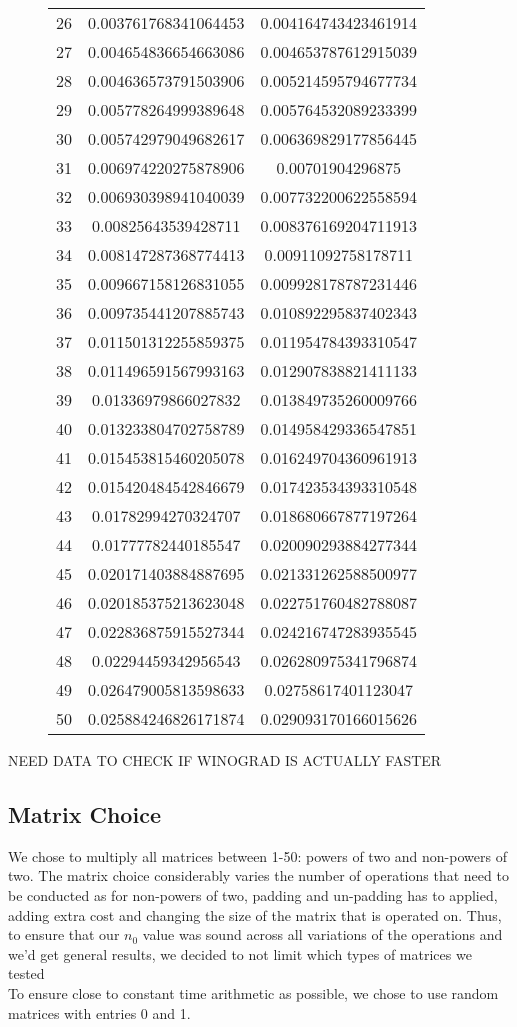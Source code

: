 \documentclass[11pt]{scrartcl}
\theoremstyle{dotlessP}
\theoremstyle{dotlessN}
\theoremstyle{dotN}
\begin{document}
\begin{figure}[H]
\begin{tabular}{c|c|c}
26 & 0.003761768341064453 & 0.004164743423461914 \\
27 & 0.004654836654663086 & 0.004653787612915039 \\
28 & 0.004636573791503906 & 0.005214595794677734 \\
29 & 0.005778264999389648 & 0.005764532089233399 \\
30 & 0.005742979049682617 & 0.006369829177856445 \\
31 & 0.006974220275878906 & 0.00701904296875 \\
32 & 0.006930398941040039 & 0.007732200622558594 \\
33 & 0.00825643539428711 & 0.008376169204711913 \\
34 & 0.008147287368774413 & 0.00911092758178711 \\
35 & 0.009667158126831055 & 0.009928178787231446 \\
36 & 0.009735441207885743 & 0.010892295837402343 \\
37 & 0.011501312255859375 & 0.011954784393310547 \\
38 & 0.011496591567993163 & 0.012907838821411133 \\
39 & 0.01336979866027832 & 0.013849735260009766 \\
40 & 0.013233804702758789 & 0.014958429336547851 \\
41 & 0.015453815460205078 & 0.016249704360961913 \\
42 & 0.015420484542846679 & 0.017423534393310548 \\
43 & 0.01782994270324707 & 0.018680667877197264 \\
44 & 0.01777782440185547 & 0.020090293884277344 \\
45 & 0.020171403884887695 & 0.021331262588500977 \\
46 & 0.020185375213623048 & 0.022751760482788087 \\
47 & 0.022836875915527344 & 0.024216747283935545 \\
48 & 0.02294459342956543 & 0.026280975341796874 \\
49 & 0.026479005813598633 & 0.02758617401123047 \\
50 & 0.025884246826171874 & 0.029093170166015626 \\

\end{tabular}
\end{figure}
NEED DATA TO CHECK IF WINOGRAD IS ACTUALLY FASTER 

\subsection{Matrix Choice}
We chose to multiply all matrices between 1-50: powers of two and non-powers of two. The matrix choice considerably varies the number of operations that need to be conducted as for non-powers of two, padding and un-padding has to applied, adding extra cost and changing the size of the matrix that is operated on. Thus, to ensure that our $n_0$ value was sound across all variations of the operations and we'd get general results, we decided to not limit which types of matrices we tested \\ 

To ensure close to constant time arithmetic as possible, we chose to use random matrices with entries 0 and 1.
\end{document}

